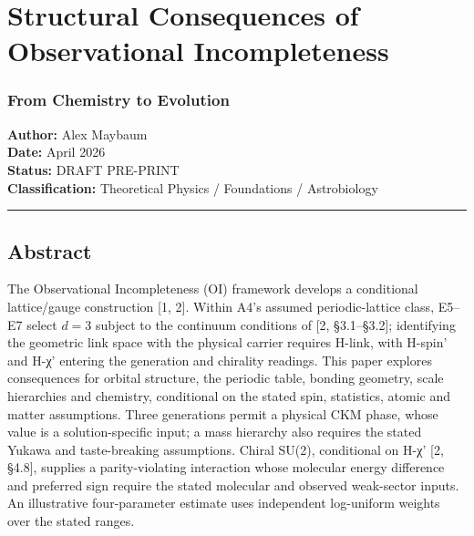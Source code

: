 \documentclass[
]{article}
\author{}
\date{}
\begin{document}
\hypertarget{structural-consequences-of-observational-incompleteness}{%
\section{Structural Consequences of Observational
Incompleteness}\label{structural-consequences-of-observational-incompleteness}}

\hypertarget{from-chemistry-to-evolution}{%
\subsubsection{From Chemistry to
Evolution}\label{from-chemistry-to-evolution}}

\textbf{Author:} Alex Maybaum\\
\textbf{Date:} April 2026\\
\textbf{Status:} DRAFT PRE-PRINT\\
\textbf{Classification:} Theoretical Physics / Foundations /
Astrobiology

\begin{center}\rule{0.5\linewidth}{0.5pt}\end{center}

\hypertarget{abstract}{%
\subsection{Abstract}\label{abstract}}

The Observational Incompleteness (OI) framework develops a conditional
lattice/gauge construction {[}1, 2{]}. Within A4's assumed
periodic-lattice class, E5--E7 select \(d=3\) subject to the continuum
conditions of {[}2, §3.1--§3.2{]}; identifying the geometric link space
with the physical carrier requires H-link, with H-spin' and H-χ'
entering the generation and chirality readings. This paper explores
consequences for orbital structure, the periodic table, bonding
geometry, scale hierarchies and chemistry, conditional on the stated
spin, statistics, atomic and matter assumptions. Three generations
permit a physical CKM phase, whose value is a solution-specific input; a
mass hierarchy also requires the stated Yukawa and taste-breaking
assumptions. Chiral SU(2), conditional on H-χ' {[}2, §4.8{]}, supplies a
parity-violating interaction whose molecular energy difference and
preferred sign require the stated molecular and observed weak-sector
inputs. An illustrative four-parameter estimate uses independent
log-uniform weights over the stated ranges.
\end{document}
